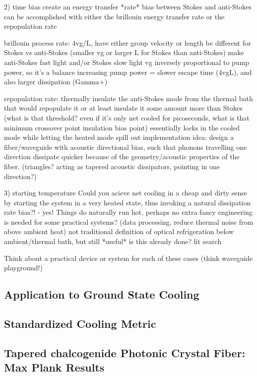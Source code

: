 2) time bias
     create an energy transfer *rate* bias between Stokes and anti-Stokes
     can be accomplished with either the brillouin energy transfer rate or the repopulation rate

       brillouin process rate:
         4vg/L, have either group velocity or length be different for Stokes vs anti-Stokes (smaller vg or larger L for Stokes than anti-Stokes)
         make anti-Stokes fast light and/or Stokes slow light
         vg inversely proportional to pump power, so it's a balance
           increasing pump power = slower escape time (4vgL), and also larger dissipation (Gamma+)

       repopulation rate:
         thermally insulate the anti-Stokes mode from the thermal bath that would repopulate it
         or at least insulate it some amount more than Stokes (what is that threshold? even if it's only net cooled for picoseconds, what is that minimum crossover point insulation bias point)
         essentially locks in the cooled mode while letting the heated mode spill out
         implementation idea:
           design a fiber/waveguide with acoustic directional bias, such that phonons travelling one direction dissipate quicker because of the geometry/acoustic properties of the fiber. (triangles? acting as tapered acoustic dissipators, pointing in one direction?)

3) starting temperature
     Could you acieve net cooling in a cheap and dirty sense by starting the system in a very heated state, thus invoking a natural dissipation rate bias?! - yes!
     Things do naturally run hot, perhaps no extra fancy engineering is needed for some practical systems? (data processing, reduce thermal noise from above ambient heat)
     not traditional definition of optical refrigeration below ambient/thermal bath, but still *useful*
     is this already done? lit search

Think about a practical device or system for each of these cases (think waveguide playground!)

\subsection{Application to Ground State Cooling}
\label{subsec:Cooling:Discussion:Ground-State}


\subsection{Standardized Cooling Metric}
\label{subsec:Cooling:Discussion:Metric}


\subsection{Tapered chalcogenide Photonic Crystal Fiber: Max Plank Results}
\label{subsec:Cooling:Discussion:Max-Plank}
